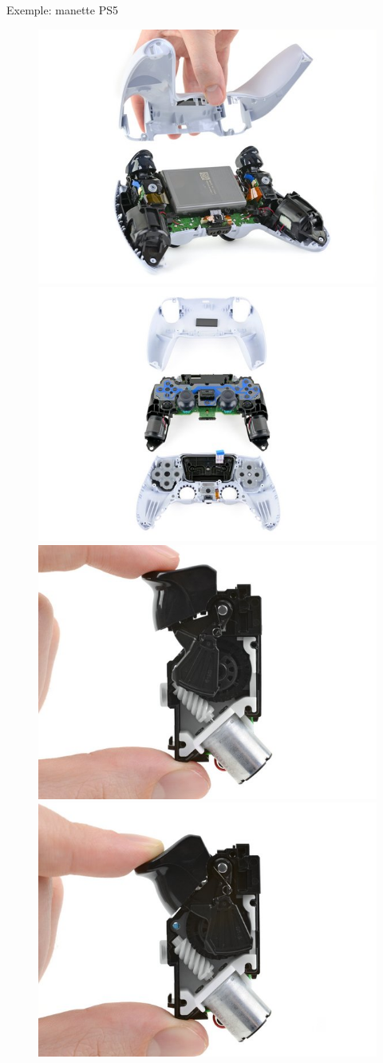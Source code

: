 \documentclass[compress, noflama]{beamer}
\begin{document}
{
\begin{frame}{Exemple: manette PS5}
\begin{figure}
\centering
\includegraphics[width=0.4\linewidth]{images/ps5_open}
\includegraphics[width=0.4\linewidth]{images/ps5_breakdown}
\includegraphics[width=0.4\linewidth]{images/ps5_trigger}
\includegraphics[width=0.4\linewidth]{images/ps5_trigger2}
\end{figure}
\end{frame}
}
\end{document}
